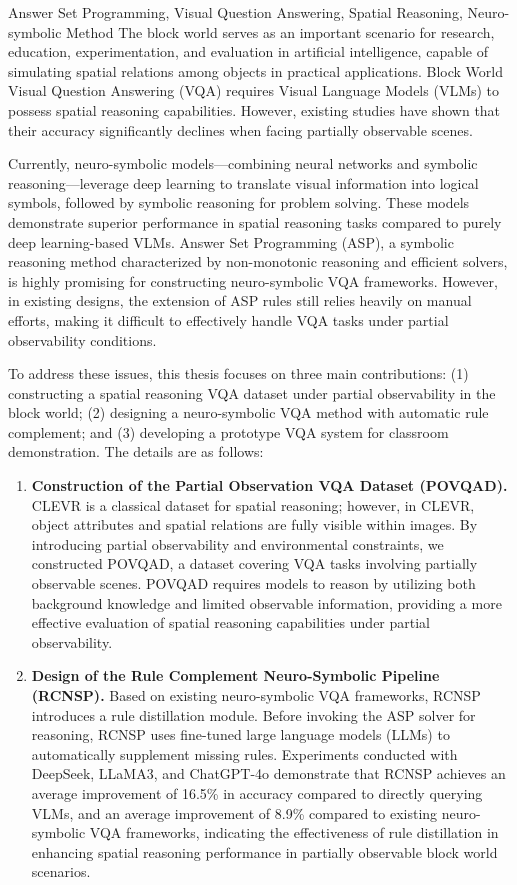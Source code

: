 \begin{englishabstract}{Answer Set Programming, Visual Question Answering, Spatial Reasoning, Neuro-symbolic Method}
The block world serves as an important scenario for research, education, experimentation, and evaluation in artificial intelligence, capable of simulating spatial relations among objects in practical applications. Block World Visual Question Answering (VQA) requires Visual Language Models (VLMs) to possess spatial reasoning capabilities. However, existing studies have shown that their accuracy significantly declines when facing partially observable scenes. 

Currently, neuro-symbolic models—combining neural networks and symbolic reasoning—leverage deep learning to translate visual information into logical symbols, followed by symbolic reasoning for problem solving. These models demonstrate superior performance in spatial reasoning tasks compared to purely deep learning-based VLMs. Answer Set Programming (ASP), a symbolic reasoning method characterized by non-monotonic reasoning and efficient solvers, is highly promising for constructing neuro-symbolic VQA frameworks. However, in existing designs, the extension of ASP rules still relies heavily on manual efforts, making it difficult to effectively handle VQA tasks under partial observability conditions.

To address these issues, this thesis focuses on three main contributions: (1) constructing a spatial reasoning VQA dataset under partial observability in the block world; (2) designing a neuro-symbolic VQA method with automatic rule complement; and (3) developing a prototype VQA system for classroom demonstration. The details are as follows:

\begin{enumerate}[nosep]
\item \textbf{Construction of the Partial Observation VQA Dataset (POVQAD).} CLEVR is a classical dataset for spatial reasoning; however, in CLEVR, object attributes and spatial relations are fully visible within images. By introducing partial observability and environmental constraints, we constructed POVQAD, a dataset covering VQA tasks involving partially observable scenes. POVQAD requires models to reason by utilizing both background knowledge and limited observable information, providing a more effective evaluation of spatial reasoning capabilities under partial observability.

\item \textbf{Design of the Rule Complement Neuro-Symbolic Pipeline (RCNSP).} Based on existing neuro-symbolic VQA frameworks, RCNSP introduces a rule distillation module. Before invoking the ASP solver for reasoning, RCNSP uses fine-tuned large language models (LLMs) to automatically supplement missing rules. Experiments conducted with DeepSeek, LLaMA3, and ChatGPT-4o demonstrate that RCNSP achieves an average improvement of 16.5\% in accuracy compared to directly querying VLMs, and an average improvement of 8.9\% compared to existing neuro-symbolic VQA frameworks, indicating the effectiveness of rule distillation in enhancing spatial reasoning performance in partially observable block world scenarios.


\end{enumerate}
\end{englishabstract}

